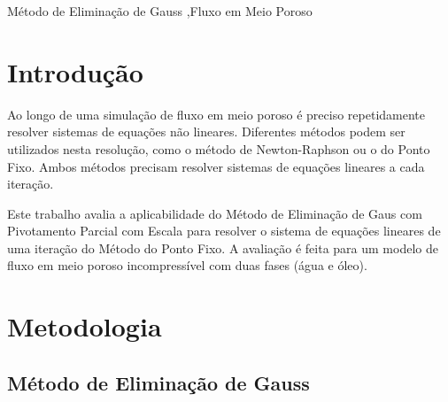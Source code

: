\documentclass[final,5p]{elsarticle}
\numberwithin{equation}{section}
\begin{document}
\begin{frontmatter}
\begin{abstract}
\end{abstract}




\begin{keyword}
    Método de Eliminação de Gauss \sep Fluxo em Meio Poroso



\end{keyword}

\end{frontmatter}


\section{Introdução}

    Ao longo de uma simulação de fluxo em meio poroso é preciso repetidamente resolver sistemas de equações não lineares. Diferentes métodos podem ser utilizados nesta resolução, como o método de Newton-Raphson ou o do Ponto Fixo. Ambos métodos precisam resolver sistemas de equações lineares a cada iteração.

    Este trabalho avalia a aplicabilidade do Método de Eliminação de Gaus com Pivotamento Parcial com Escala para resolver o sistema de equações lineares de uma iteração do Método do Ponto Fixo. A avaliação é feita para um modelo de fluxo em meio poroso incompressível com duas fases (água e óleo).

\section{Metodologia}

    \subsection{Método de Eliminação de Gauss}
\end{document}

